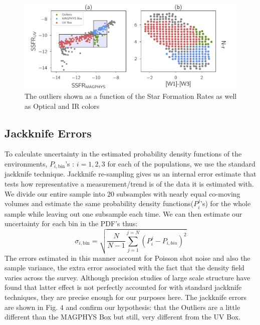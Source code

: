 \begin{figure}
\includegraphics[width=\textwidth]{figures/3_outliers.pdf}
\caption[The outliers shown as a function of the Star Formation Rates as well as Optical and IR colors.]
{The outliers shown as a function of the Star Formation Rates as well as Optical and IR colors
\label{fig:outliers}}
\end{figure}
 
 \subsection{Jackknife Errors}
 To calculate uncertainty in the estimated probability density functions of the environments, $P_{i,\mathrm{bin}}$'s : $i = 1,2,3$ for each of the populations, we use the standard jackknife technique. Jackknife re-sampling gives us an internal error estimate that tests how representative a measurement/trend is of the data it is estimated with. We divide our entire sample into $20$ subsamples with nearly equal co-moving volumes and estimate the same probability density functions($P^{j}_{i}$'s) for the whole sample while leaving out one subsample each time. We can then estimate our uncertainty for each bin in the PDF's thus:\\
 $$ \sigma_{i, \mathrm{bin}} = \sqrt{\frac{N}{N-1} \sum_{j = 1}^{j = N} (P^{j}_{i} - P_{i,bin})^{2}} $$
 The errors estimated in this manner account for Poisson shot noise and also the sample variance, the extra error associated with the fact that the density field varies across the survey. Although precision studies of large scale structure have found that latter effect is not perfectly accounted for with standard jackknife techniques, they are precise enough for our purposes here. The jackknife errors are shown in Fig. $4$ and confirm our hypothesis: that the Outliers are a little different than the MAGPHYS Box but still, very different from the UV Box.\\

